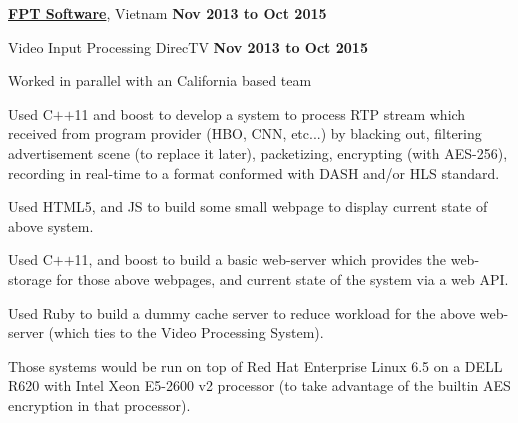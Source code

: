 \documentclass[10pt]{article}
\renewcommand\emph[1]{#1}
\begin{document}
\href{http://www.fpt-software.com/}{\textbf{FPT Software}}, Vietnam%
    \hfill \textbf{Nov 2013 to Oct 2015}
\begin{outerlist}
    \item[] \emph{Video Input Processing} DirecTV%
        \hfill \textbf{Nov 2013 to Oct 2015}
            \begin{innerlist}
                \item Worked in parallel with an California based team
                \item Used C$+$$+$11 and boost to develop a system to process
                     RTP stream which received from program provider (HBO, CNN,
                     etc...) by blacking out, filtering advertisement scene (to
                     replace it later), packetizing, encrypting (with AES-256),
                     recording in real-time to a format conformed with DASH
                     and/or HLS standard.
                \item Used HTML5, and JS to build some small webpage to display
                     current state of above system.
                \item Used C$+$$+$11, and boost to build a basic web-server
                     which provides the web-storage for those above webpages,
                     and current state of the system via a web API.
                \item Used Ruby to build a dummy cache server to reduce
                     workload for the above web-server (which ties to the Video
                     Processing System).
                \item Those systems would be run on top of Red Hat Enterprise
                     Linux 6.5 on a DELL R620 with Intel Xeon E5-2600 v2
                     processor (to take advantage of the builtin AES encryption
                     in that processor).
            \end{innerlist}
\end{outerlist}
\end{document}
